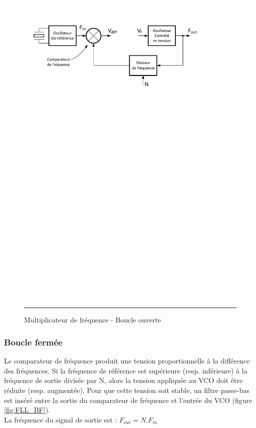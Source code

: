 \begin{figure}[htb]
  \centering
  \includegraphics [angle=0, width=11cm]{./Figures/Chap6_Horloges/FLL_BO.pdf}
  \rule{35em}{0.5pt}
  \caption{Multiplicateur de fréquence - Boucle ouverte}
  \label{fig:FLL_BO}
\end{figure}

\subsubsection*{Boucle fermée}
Le comparateur de fréquence produit une tension proportionnelle à la différence des fréquences. Si la fréquence de référence est supérieure (resp. inférieure) à la fréquence de sortie divisée par N, alors la tension appliquée au VCO doit être réduite (resp. augmentée). Pour que cette tension soit stable, un filtre passe-bas est inséré entre la sortie du comparateur de fréquence et l'entrée du VCO (figure \ref{fig:FLL_BF}).\\
La fréquence du signal de sortie est : $F_{out}=N.F_{in}$

